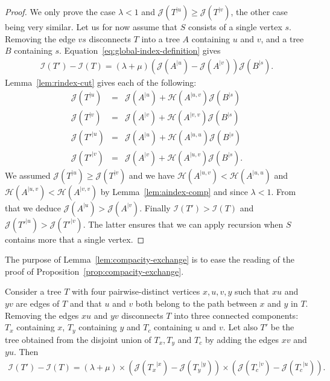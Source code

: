 \documentclass[11 pt]{modarticle}
\newcommand{\rtree}[2]{{#1}^{\lvert #2}}
\newcommand{\indexsymbol}{\mathcal{I}}
\newcommand{\tindex}[1]{\indexsymbol(#1)}
\newcommand{\rindexsymbol}{\mathcal{J}}
\newcommand{\rindex}[2]{\rindexsymbol(\rtree{#2}{#1})}
\newcommand{\aindexsymbol}{\mathcal{H}}
\newcommand{\aindex}[3]{\aindexsymbol(\rtree{#3}{#1, #2})}
\begin{document}
\begin{proof}
We only prove the case $\lambda < 1$ and $\rindex{u}{T} \geq \rindex{v}{T}$, the other case being very similar. Let us for now assume that $S$ consists of a single vertex $s$. Removing the edge $vs$ disconnects $T$ into a tree $A$ containing $u$ and $v$, and a tree $B$ containing $s$. Equation~\eqref{eq:global-index-definition} gives
\begin{eqnarray*}
    \tindex{T'} - \tindex{T} = (\lambda + \mu) (\rindex{u}{A} - \rindex{v}{A}) \rindex{s}{B}.
\end{eqnarray*}
 Lemma~\ref{lem:rindex-cut} gives each of the following:
\begin{eqnarray*}
	\rindex{u}{T} & = & \rindex{u}{A} + \aindex{u}{v}{A} \rindex{s}{B} \\
	\rindex{v}{T} & = & \rindex{v}{A} + \aindex{v}{v}{A} \rindex{s}{B} \\
	\rindex{u}{T'} & = & \rindex{u}{A} + \aindex{u}{u}{A} \rindex{s}{B} \\
	\rindex{v}{T'} & = & \rindex{v}{A} + \aindex{u}{v}{A} \rindex{s}{B}.
\end{eqnarray*}
We assumed $\rindex{u}{T} \geq \rindex{v}{T}$ and we have $\aindex{u}{v}{A} < \aindex{u}{u}{A}$ and $\aindex{u}{v}{A} < \aindex{v}{v}{A}$ by Lemma~\ref{lem:aindex-comp} and since $\lambda < 1$. From that we deduce $\rindex{u}{A} > \rindex{v}{A}$. Finally $\tindex{T'} > \tindex{T}$ and $\rindex{u}{T'} > \rindex{v}{T'}$. The latter ensures that we can apply recursion when $S$ contains more that a single vertex.
\end{proof}

The purpose of Lemma~\ref{lem:compacity-exchange} is to ease the reading of the proof of Proposition~\ref{prop:compacity-exchange}.

\begin{lem}\label{lem:compacity-exchange}
Consider a tree $T$ with four pairwise-distinct vertices $x,u,v,y$ such that $xu$ and $yv$ are edges of $T$ and that $u$ and $v$ both belong to the path between $x$ and $y$ in $T$. Removing the edges $xu$ and $yv$ disconnects $T$ into three connected components: $T_x$ containing $x$, $T_y$ containing $y$ and $T_c$ containing $u$ and $v$. Let also $T'$ be the tree obtained from the disjoint union of $T_x, T_y$ and $T_c$ by adding the edges $xv$ and $yu$. Then
\begin{eqnarray*}
	\tindex{T'} - \tindex{T} = (\lambda + \mu) \times (\rindex{x}{T_x} - \rindex{y}{T_y}) \times (\rindex{v}{T_c} - \rindex{u}{T_c}).
\end{eqnarray*}
\end{lem}
\end{document}
